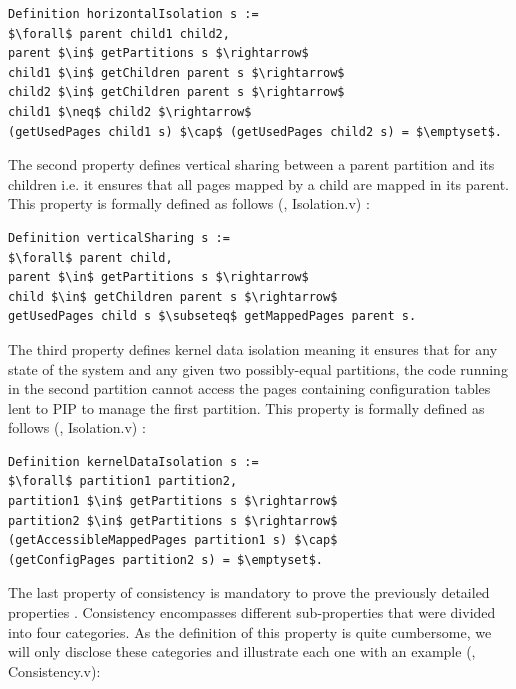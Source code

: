 \begin{lstlisting}[caption = {Horizontal isolation}, mathescape=true,xleftmargin=.02\textwidth,
xrightmargin=.02\textwidth]
Definition horizontalIsolation s :=
$\forall$ parent child1 child2,
parent $\in$ getPartitions s $\rightarrow$
child1 $\in$ getChildren parent s $\rightarrow$
child2 $\in$ getChildren parent s $\rightarrow$
child1 $\neq$ child2 $\rightarrow$
(getUsedPages child1 s) $\cap$ (getUsedPages child2 s) = $\emptyset$.
\end{lstlisting}
The second property defines vertical sharing between a parent partition and its children i.e. it ensures that all pages mapped by a child are mapped in its parent. This property is formally defined as follows (\cite{PIP}, Isolation.v) :
\begin{lstlisting}[caption = {Vertical sharing}, mathescape=true,xleftmargin=.08\textwidth,
xrightmargin=.08\textwidth]
Definition verticalSharing s :=
$\forall$ parent child,
parent $\in$ getPartitions s $\rightarrow$
child $\in$ getChildren parent s $\rightarrow$
getUsedPages child s $\subseteq$ getMappedPages parent s.
\end{lstlisting}
The third property defines kernel data isolation meaning it ensures that for any state of the system and any given two possibly-equal partitions, the code running in the second partition cannot access the pages containing configuration tables lent to PIP to manage the first partition. This property is formally defined as follows (\cite{PIP}, Isolation.v) :
\begin{lstlisting}[caption = {Kernel data isolation}, mathescape=true,xleftmargin=.12\textwidth,
xrightmargin=.12\textwidth]
Definition kernelDataIsolation s :=
$\forall$ partition1 partition2,
partition1 $\in$ getPartitions s $\rightarrow$
partition2 $\in$ getPartitions s $\rightarrow$
(getAccessibleMappedPages partition1 s) $\cap$
(getConfigPages partition2 s) = $\emptyset$.
\end{lstlisting}
The last property of consistency is mandatory to prove the previously detailed properties . Consistency encompasses different sub-properties that were divided into four categories. As the definition of this property is quite cumbersome, we will only disclose these categories and illustrate each one with an example (\cite{PIP}, Consistency.v):
